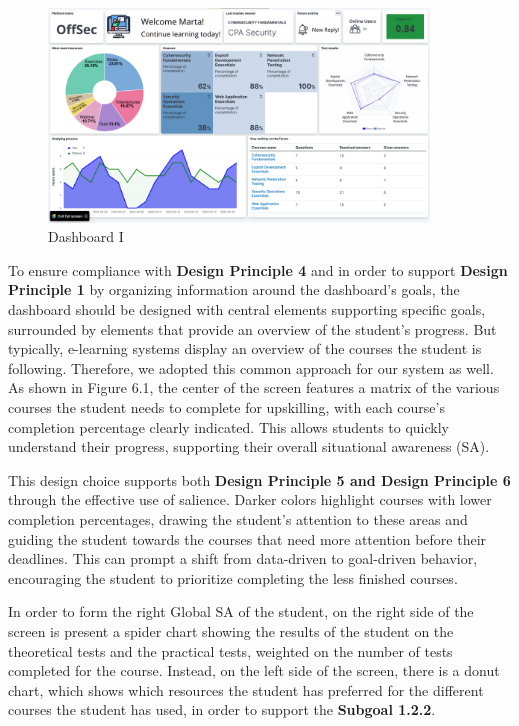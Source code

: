 \begin{figure}[H]
    \centering
    \includegraphics[width=0.9\textwidth]{assets/dashboard_1.png}
    \caption{Dashboard I}
    \label{fig:dashboard_1}
\end{figure}

To ensure compliance with \textbf{Design Principle 4} and in order to support \textbf{Design Principle 1} by organizing information around the dashboard's goals, the dashboard should be designed with central elements supporting specific goals, 
surrounded by elements that provide an overview of the student's progress. But typically, e-learning systems display an overview of the courses the student is following. 
Therefore, we adopted this common approach for our system as well.
As shown in Figure 6.1, the center of the screen features a matrix of the various courses the student needs to complete for upskilling, 
with each course's completion percentage clearly indicated. This allows students to quickly understand their progress, supporting their 
overall situational awareness (SA).

This design choice supports both \textbf{Design Principle 5 and Design Principle 6} through the effective use of salience. 
Darker colors highlight courses with lower completion percentages, drawing the student's attention to these areas and guiding the student towards the courses that need more
attention before their deadlines. This can prompt a shift from data-driven to goal-driven behavior, encouraging the student to prioritize completing the less finished courses. 

In order to form the right Global SA of the student, on 
the right side of the screen is present a spider chart showing the results of the student on the theoretical tests and
the practical tests, weighted on the number of tests completed for the course.
Instead, on the left side of the screen, there is a
donut chart, which shows which resources the student has preferred for the different courses 
the student has used, in order to support the \textbf{Subgoal 1.2.2}.

